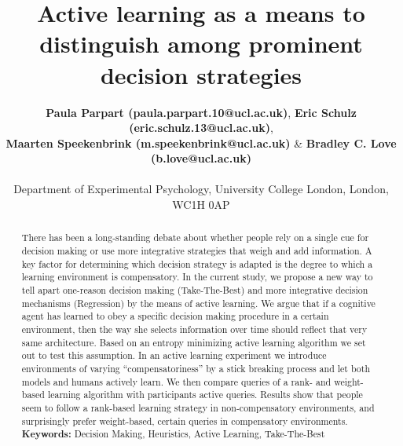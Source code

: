 \documentclass[10pt,letterpaper]{article}
\title{Active learning as a means to distinguish among prominent decision strategies}
\author{{\large \bf Paula Parpart (paula.parpart.10@ucl.ac.uk)}, {\large \bf Eric Schulz (eric.schulz.13@ucl.ac.uk)}, \\{\large \bf Maarten Speekenbrink (m.speekenbrink@ucl.ac.uk)} \& {\large \bf Bradley C. Love (b.love@ucl.ac.uk)}\\\\
Department of Experimental Psychology, University College London, London, WC1H 0AP}
\begin{document}
\maketitle


\begin{abstract}
There has been a long-standing debate about whether people rely on a single cue for decision making or use more integrative strategies that weigh and add information. A key factor for determining which decision strategy is adapted is the degree to which a learning environment is compensatory. In the current study, we propose a new way to tell apart one-reason decision making (Take-The-Best) and more integrative decision mechanisms (Regression) by the means of active learning. We argue that if a cognitive agent has learned to obey a specific decision making procedure in a certain environment, then the way she selects information over time should reflect that very same architecture. Based on an entropy minimizing active learning algorithm we set out to test this assumption. In an active learning experiment we introduce environments of varying ``compensatoriness'' by a stick breaking process and let both models and humans actively learn. We then compare queries of a rank- and weight-based learning algorithm with participants active queries. Results show that people seem to follow a rank-based learning strategy in non-compensatory environments, and surprisingly prefer weight-based, certain queries in compensatory environments.\\
\textbf{Keywords:} 
Decision Making, Heuristics, Active Learning, Take-The-Best
\end{abstract}
\end{document}
